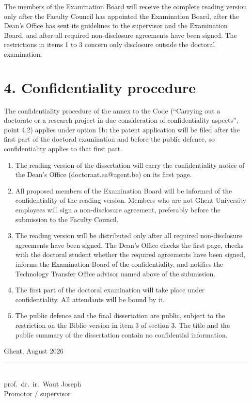 \documentclass[10pt,a4paper]{article}
\begin{document}
The members of the Examination Board will receive the complete reading version only after the Faculty Council has appointed the Examination Board, after the Dean's Office has sent its guidelines to the supervisor and the Examination Board, and after all required non-disclosure agreements have been signed. The restrictions in items 1 to 3 concern only disclosure outside the doctoral examination.

\newpage
\section*{4. Confidentiality procedure}

The confidentiality procedure of the annex to the Code (``Carrying out a doctorate or a research project in due consideration of confidentiality aspects'', point 4.2) applies under option 1b: the patent application will be filed after the first part of the doctoral examination and before the public defence, so confidentiality applies to that first part.

\begin{enumerate}[leftmargin=*]
\item The reading version of the dissertation will carry the confidentiality notice of the Dean's Office (\mbox{doctoraat.ea@ugent.be}) on its first page.
\item All proposed members of the Examination Board will be informed of the confidentiality of the reading version. Members who are not Ghent University employees will sign a non-disclosure agreement, preferably before the submission to the Faculty Council.
\item The reading version will be distributed only after all required non-disclosure agreements have been signed. The Dean's Office checks the first page, checks with the doctoral student whether the required agreements have been signed, informs the Examination Board of the confidentiality, and notifies the Technology Transfer Office advisor named above of the submission.
\item The first part of the doctoral examination will take place under confidentiality. All attendants will be bound by it.
\item The public defence and the final dissertation are public, subject to the restriction on the Biblio version in item 3 of section 3. The title and the public summary of the dissertation contain no confidential information.
\end{enumerate}

\vspace{1em}

\noindent\hfill\begin{minipage}{0.45\textwidth}
Ghent, August 2026

\vspace{3.5em}

\rule{0.8\linewidth}{0.4pt}\\[0.2em]
prof.\ dr.\ ir.\ Wout Joseph\\
Promotor / supervisor
\end{minipage}
\end{document}
